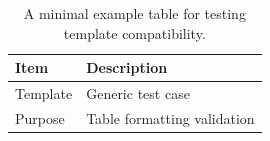\begin{table}[h]
\centering
\begin{tabular}{ll}
\toprule
Item & Description \\
\midrule
Template & Generic test case \\
Purpose & Table formatting validation \\
\bottomrule
\end{tabular}
\caption{A minimal example table for testing template compatibility.}
\label{tab:example}
\end{table}
